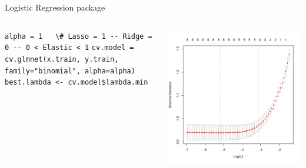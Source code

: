 
\begin{frame}{Logistic Regression package}

\begin{columns}[T]
\vspace*{1em}\begin{column}{0.5\textwidth}
\lstinline|alpha = 1   \# Lasso = 1 -- Ridge = 0 -- 0 < Elastic < 1|
\lstinline|cv.model = cv.glmnet(x.train, y.train, family="binomial", alpha=alpha)|
\lstinline|best.lambda <- cv.model$lambda.min|
\end{column}
\begin{column}{0.5\textwidth}
\hspace*{-1em}\includegraphics[width=1.2\columnwidth]{./Figures/logist/cv_lambda.pdf}
\end{column}
\end{columns}

\end{frame}

